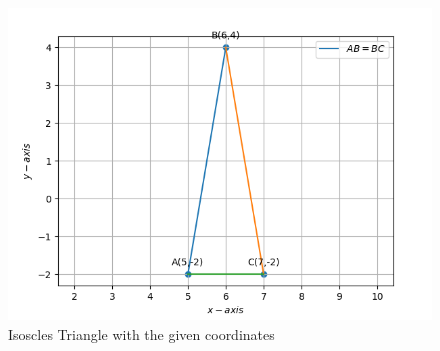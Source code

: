 \documentclass[12pt]{article}
\begin{document}
\begin{enumerate}
\begin{figure}[!h]
	\begin{center} 
	    \includegraphics[width=\columnwidth]{figs/Vector2.png}
	\end{center}
\caption{Isoscles Triangle with the given coordinates}
\label{fig:Fig}
\end{figure}
\end{enumerate}
\end{document}
